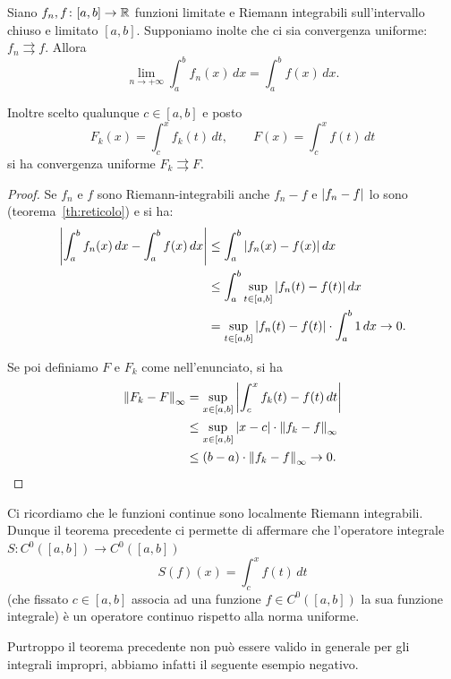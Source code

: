 \begin{theorem}%
  \label{th:scambio_limite_integrale}%
  \mymark{***}%
  Siano $f_n,f\colon [a,b] \to {\mathbb R}$ funzioni limitate 
  e Riemann integrabili sull'intervallo chiuso e limitato $[a,b]$.
  Supponiamo inolte che ci sia convergenza uniforme: 
  $f_n \rightrightarrows f$.
  Allora 
  \[
      \lim_{n\to+\infty} \int_a^b f_n(x)\, dx 
      = \int_a^b f(x)\, dx.
  \]

  Inoltre scelto qualunque $c\in [a,b]$ e posto
  \[
    F_k(x) = \int_{c}^x f_k(t)\, dt,
    \qquad
    F(x) = \int_{c}^x f(t)\, dt
  \]
  si ha convergenza uniforme $F_k \rightrightarrows F$.
\end{theorem}
\begin{proof}
  Se $f_n$ e $f$ sono Riemann-integrabili anche $f_n-f$ e ${\left|f_n-f\right|}$ lo sono 
  (teorema~\ref{th:reticolo})
  e si ha:
  \begin{align*}
    {\left|\int_a^b f_n(x)\, dx - \int_a^b f(x)\, dx\right|}
    &\le \int_a^b {\left|f_n(x)-f(x)\right|}\, dx \\
    &\le \int_a^b \sup_{t\in[a,b]} {\left|f_n(t)-f(t)\right|}\, dx \\
    &= \sup_{t\in [a,b]}{\left|f_n(t)-f(t)\right|}\cdot \int_a^b 1\, dx
    \to 0.
  \end{align*}

  Se poi definiamo $F$ e $F_k$ come nell'enunciato, si ha
  \begin{align*}
  {\left\Vert F_k-F\right\Vert}_\infty
  &= \sup_{x\in [a,b]} {\left|\int_c^x f_k(t)-f(t)\, dt\right|} \\
  &\le \sup_{x\in [a,b]} {\left|x-c\right|} \cdot {\left\Vert f_k-f\right\Vert}_\infty \\
  &\le (b-a) \cdot {\left\Vert f_k-f\right\Vert}_\infty
  \to 0.
  \end{align*}
\end{proof}
  
Ci ricordiamo che le funzioni continue sono localmente Riemann integrabili.
Dunque il teorema precedente ci permette di affermare che l'operatore integrale 
$S\colon C^0([a,b]) \to C^0([a,b])$
\[
S(f)(x) = \int_{c}^x f(t)\, dt
\]
(che fissato $c \in [a,b]$ associa ad una funzione $f\in C^0([a,b])$ la sua funzione integrale) 
è un operatore continuo rispetto alla norma uniforme.

Purtroppo il teorema precedente non può essere valido in generale per gli integrali impropri,
abbiamo infatti il seguente esempio negativo.

